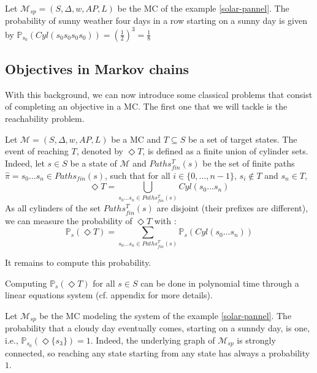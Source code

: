 \begin{example}
  Let $\mathcal{M}_{sp} = (S, \Delta, w, AP, L)$ be the MC of the example \ref{solar-pannel}. The probability of sunny weather four days in a row starting on a sunny day is given
  by $\mathbb{P}_{s_0}(Cyl(s_0s_0s_0s_0)) = (\frac{1}{2})^3 = \frac{1}{8}$
\end{example}

\subsection{Objectives in Markov chains}

With this background, we can now introduce some classical problems that consist
of completing an objective in a MC. The first one that we will tackle is the reachability problem.
\begin{definition}
  Let $\mathcal{M} = (S, \Delta, w, AP, L)$ be a MC and $T \subseteq S$ be a set of target states. The event of reaching $T$, denoted by $\Diamond T$,
  is defined as a finite union of cylinder sets. Indeed, let $s \in S$ be a state of $\mathcal{M}$ and $Paths_{fin}^T(s)$ be the set of finite paths $\hat{\pi} = s_0 \dots s_n \in Paths_{fin}(s)$, such that for all $i \in \{0, \dots, n-1 \}, \, s_i \not \in T$ and $s_n \in T$,
  \[ \Diamond T = \bigcup_{s_0 \dots s_n \in Paths_{fin}^T(s)} Cyl(s_0 \dots s_n) \]
  As all cylinders of the set $Paths_{fin}^T(s)$ are disjoint (their prefixes are different), we can measure the probability of $\Diamond T$ with :
  \[
    \mathbb{P}_s(\Diamond T) = \sum_{s_0 \dots s_n \in Paths_{fin}^T(s)}  \mathbb{P}_s(Cyl(s_0 \dots s_n))
  \]
\end{definition}
It remains to compute this probability.

\begin{theorem}
Computing $\mathbb{P}_s(\Diamond T)$ for all $s \in S$ can be done in polynomial
time through a linear equations system (cf. appendix for more details).
\end{theorem}

\begin{example}
  Let $\mathcal{M}_{sp}$ be the MC modeling the system of the example \ref{solar-pannel}.
   The probability that a cloudy day eventually comes, starting on a sunndy day, is one, i.e., $\mathbb{P}_{s_0}(\Diamond \{s_3\}) = 1$. Indeed, the underlying graph of $\mathcal{M}_{sp}$ is strongly connected, so reaching any state starting from any state has always a probability $1$.
\end{example}

